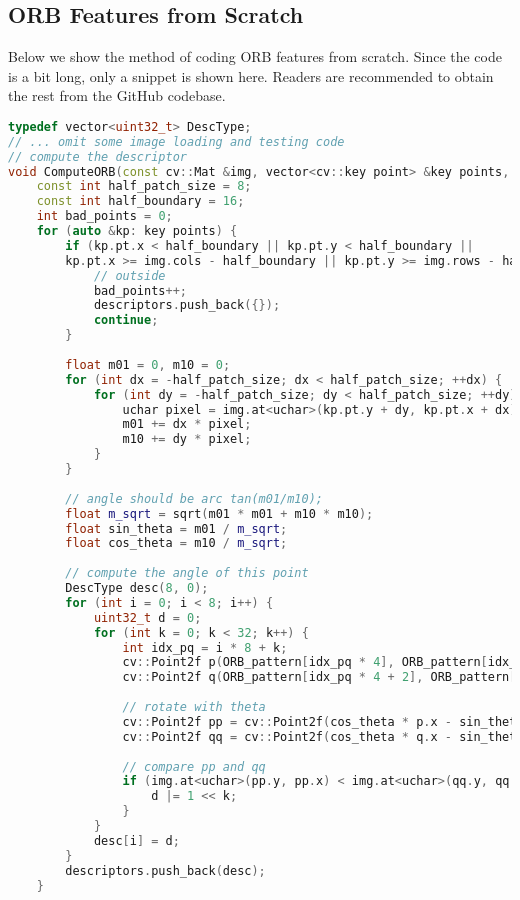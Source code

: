 \subsection{ORB Features from Scratch}
Below we show the method of coding ORB features from scratch. Since the code is a bit long, only a snippet is shown here. Readers are recommended to obtain the rest from the GitHub codebase.
\begin{lstlisting}[language=c++,caption=slambook2/ch7/orb_self.cpp (part)]
typedef vector<uint32_t> DescType;
// ... omit some image loading and testing code
// compute the descriptor
void ComputeORB(const cv::Mat &img, vector<cv::key point> &key points, vector<DescType> &descriptors) {
    const int half_patch_size = 8;
    const int half_boundary = 16;
    int bad_points = 0;
    for (auto &kp: key points) {
        if (kp.pt.x < half_boundary || kp.pt.y < half_boundary ||
        kp.pt.x >= img.cols - half_boundary || kp.pt.y >= img.rows - half_boundary) {
            // outside
            bad_points++;
            descriptors.push_back({});
            continue;
        }
    
        float m01 = 0, m10 = 0;
        for (int dx = -half_patch_size; dx < half_patch_size; ++dx) {
            for (int dy = -half_patch_size; dy < half_patch_size; ++dy) {
                uchar pixel = img.at<uchar>(kp.pt.y + dy, kp.pt.x + dx);
                m01 += dx * pixel;
                m10 += dy * pixel;
            }
        }
    
        // angle should be arc tan(m01/m10);
        float m_sqrt = sqrt(m01 * m01 + m10 * m10);
        float sin_theta = m01 / m_sqrt;
        float cos_theta = m10 / m_sqrt;
        
        // compute the angle of this point
        DescType desc(8, 0);
        for (int i = 0; i < 8; i++) {
            uint32_t d = 0;
            for (int k = 0; k < 32; k++) {
                int idx_pq = i * 8 + k;
                cv::Point2f p(ORB_pattern[idx_pq * 4], ORB_pattern[idx_pq * 4 + 1]);
                cv::Point2f q(ORB_pattern[idx_pq * 4 + 2], ORB_pattern[idx_pq * 4 + 3]);
        
                // rotate with theta
                cv::Point2f pp = cv::Point2f(cos_theta * p.x - sin_theta * p.y, sin_theta * p.x + cos_theta * p.y) + kp.pt;
                cv::Point2f qq = cv::Point2f(cos_theta * q.x - sin_theta * q.y, sin_theta * q.x + cos_theta * q.y) + kp.pt;	
                
                // compare pp and qq
                if (img.at<uchar>(pp.y, pp.x) < img.at<uchar>(qq.y, qq.x)) {
                    d |= 1 << k;
                }
            }
            desc[i] = d;
        }
        descriptors.push_back(desc);
    }
    

\end{lstlisting}
